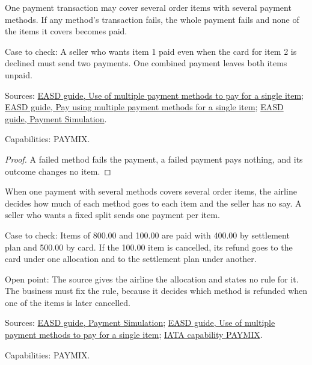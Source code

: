 \begin{theorem}
  \label{thm:payment-failed-payment-all-items}
  One payment transaction may cover several order items with several payment
  methods. If any method's transaction fails, the whole payment fails and
  none of the items it covers becomes paid.

  Case to check: A seller who wants item 1 paid even when the card for item
  2 is declined must send two payments. One combined payment leaves both
  items unpaid.

  Sources: \href{https://standards.atlassian.net/wiki/spaces/EASD/pages/2592899087/Use+of+multiple+payment+methods+to+pay+for+a+single+item}{EASD guide, Use of multiple payment methods to pay for a single item};
  \href{https://standards.atlassian.net/wiki/spaces/EASD/pages/2593325059/Pay+using+multiple+payment+methods+for+a+single+item}{EASD guide, Pay using multiple payment methods for a single item};
  \href{https://standards.atlassian.net/wiki/spaces/EASD/pages/2593030164/Payment+Simulation}{EASD guide, Payment Simulation}.

  Capabilities: PAYMIX.
\end{theorem}
\begin{proof}
  A failed method fails the payment, a failed payment pays nothing, and its
  outcome changes no item.
\end{proof}

\begin{definition}
  \label{def:payment-allocation-across-items}
  \notready
  When one payment with several methods covers several order items, the
  airline decides how much of each method goes to each item and the seller
  has no say. A seller who wants a fixed split sends one payment per item.

  Case to check: Items of 800.00 and 100.00 are paid with 400.00 by
  settlement plan and 500.00 by card. If the 100.00 item is cancelled, its
  refund goes to the card under one allocation and to the settlement plan
  under another.

  Open point: The source gives the airline the allocation and states no rule
  for it. The business must fix the rule, because it decides which method is
  refunded when one of the items is later cancelled.

  Sources: \href{https://standards.atlassian.net/wiki/spaces/EASD/pages/2593030164/Payment+Simulation}{EASD guide, Payment Simulation};
  \href{https://standards.atlassian.net/wiki/spaces/EASD/pages/2592899087/Use+of+multiple+payment+methods+to+pay+for+a+single+item}{EASD guide, Use of multiple payment methods to pay for a single item};
  \href{https://retailing.iata.org/armi/docs/PAYMIX/}{IATA capability PAYMIX}.

  Capabilities: PAYMIX.
\end{definition}

